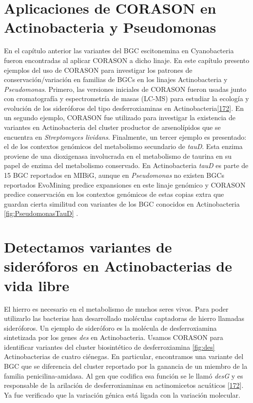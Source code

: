 \documentclass[12pt,twoside]{reedthesis}
\begin{document}
  \section{Aplicaciones de CORASON en Actinobacteria y
  Pseudomonas}\label{aplicaciones-de-corason-en-actinobacteria-y-pseudomonas}
  
  En el capítulo anterior las variantes del BGC escitonemina en
  Cyanobacteria fueron encontradas al aplicar CORASON a dicho linaje. En
  este capítulo presento ejemplos del uso de CORASON para investigar los
  patrones de conservación/variación en familias de BGCs en los linajes
  Actinobacteria y \emph{Pseudomonas}. Primero, las versiones iniciales de
  CORASON fueron usadas junto con cromatografía y espectrometría de masas
  (LC-MS) para estudiar la ecología y evolución de los sideróforos del
  tipo desferroxiaminas en
  Actinobacteria{[}\protect\hyperlink{ref-cruz-morales_actinobacteria_2017}{172}{]}.
  En un segundo ejemplo, CORASON fue utilizado para investigar la
  existencia de variantes en Actinobacteria del cluster productor de
  arsenolípidos que se encuentra en \emph{Streptomyces lividans}.
  Finalmente, un tercer ejemplo es presentado: el de los contextos
  genómicos del metabolismo secundario de \emph{tauD}. Esta enzima
  proviene de una dioxigenasa involucrada en el metabolismo de taurina en
  su papel de enzima del metabolismo conservado. En Actinobacteria
  \emph{tauD} es parte de 15 BGC reportados en MIBiG, aunque en
  \emph{Pseudomonas} no existen BGCs reportados EvoMining predice
  expansiones en este linaje genómico y CORASON predice conservación en
  los contextos genómicos de estas copias extra que guardan cierta
  similitud con variantes de los BGC conocidos en Actinobacteria
  \autoref{fig:PseudomonasTauD} .
  
  \section{Detectamos variantes de sideróforos en Actinobacterias de vida
  libre}\label{detectamos-variantes-de-sideroforos-en-actinobacterias-de-vida-libre}
  
  El hierro es necesario en el metabolismo de muchos seres vivos. Para
  poder utilizarlo las bacterias han desarrollado moléculas captadoras de
  hierro llamadas sideróforos. Un ejemplo de sideróforo es la molécula de
  desferroxiamina sintetizada por los genes \emph{des} en Actinobacteria.
  Usamos CORASON para identificar variantes del cluster biosintético de
  desferroxiamina \autoref{fig:des} Actinobacterias de cuatro ciénegas. En
  particular, encontramos una variante del BGC que se diferencia del
  cluster reportado por la ganancia de un miembro de la familia
  penicilina-amidasa. Al gen que codifica esa función se le llamó
  \emph{desG} y es responsable de la arilación de desferroxiaminas en
  actinomicetos acuáticos
  {[}\protect\hyperlink{ref-cruz-morales_actinobacteria_2017}{172}{]}. Ya
  fue verificado que la variación génica está ligada con la variación
  molecular.
  
\end{document}
